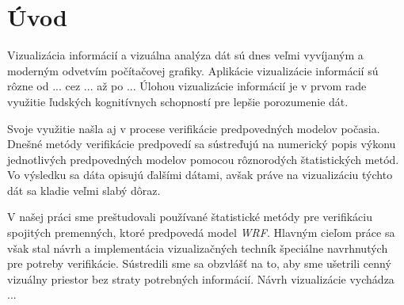 \chapter{Úvod}
	
	
Vizualizácia informácií a vizuálna analýza dát sú dnes veľmi vyvíjaným a moderným odvetvím počítačovej grafiky. Aplikácie vizualizácie informácií sú rôzne od ... cez ... až po ... Úlohou vizualizácie informácií je v prvom rade využitie ľudských kognitívnych schopností pre lepšie porozumenie dát.

Svoje využitie našla aj v procese verifikácie predpovedných modelov počasia. Dnešné metódy verifikácie predpovedí sa sústreďujú na numerický popis výkonu jednotlivých predpovedných modelov pomocou rôznorodých štatistických metód. Vo výsledku sa dáta opisujú ďalšími dátami, avšak práve na vizualizáciu týchto dát sa kladie veľmi slabý dôraz.

V našej práci sme preštudovali používané štatistické metódy pre verifikáciu spojitých premenných, ktoré predpovedá model \textit{WRF}. Hlavným cieľom práce sa však stal návrh a implementácia vizualizačných techník špeciálne navrhnutých pre potreby verifikácie. Sústredili sme sa obzvlášť na to, aby sme ušetrili cenný vizuálny priestor bez straty potrebných informácií. Návrh vizualizácie vychádza ...